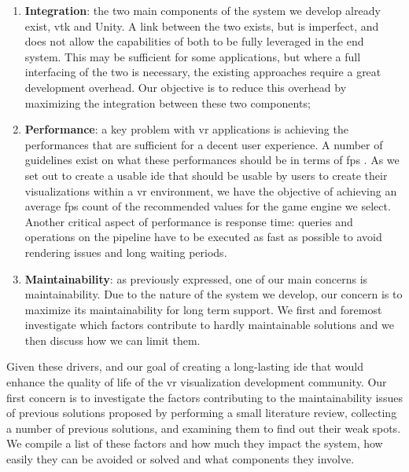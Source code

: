 \begin{enumerate}
    \item \textbf{Integration}: the two main components of the system we develop already exist, \acrshort{vtk} and Unity. A link between the two exists, but is imperfect, and does not allow the capabilities of both to be fully leveraged in the end system. This may be sufficient for some applications, but where a full interfacing of the two is necessary, the existing approaches require a great development overhead. Our objective is to reduce this overhead by maximizing the integration between these two components;
    
    \item \textbf{Performance}: a key problem with \acrshort{vr} applications is achieving the performances that are sufficient for a decent user experience. A number of guidelines exist on what these performances should be in terms of \acrfull{fps} 
    \cite{unity_vr_2020,epic_virtual_2021}. As we set out to create a usable \acrshort{ide} that should be usable by users to create their visualizations within a \acrshort{vr} environment, we have the objective of achieving an average \acrshort{fps} count of the recommended values for the game engine we select. Another critical aspect of performance is response time: queries and operations on the pipeline have to be executed as fast as possible to avoid rendering issues and long waiting periods.
    
    \item \textbf{Maintainability}: as previously expressed, one of our main concerns is maintainability. Due to the nature of the system we develop, our concern is to maximize its maintainability for long term support. We first and foremost investigate which factors contribute to hardly maintainable solutions and we then discuss how we can limit them.
\end{enumerate}

Given these drivers, and our goal of creating a long-lasting \acrshort{ide} that would enhance the quality of life of the \acrshort{vr} visualization development community. Our first concern is to investigate the factors contributing to the maintainability issues of previous solutions proposed by performing a small literature review, collecting a number of previous solutions, and examining them to find out their weak spots. We compile a list of these factors and how much they impact the system, how easily they can be avoided or solved and what components they involve.

